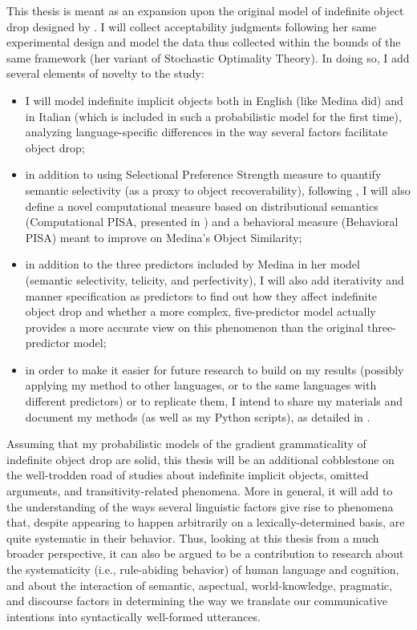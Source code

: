 This thesis is meant as an expansion upon the original model of indefinite object drop designed by \textcite{Medina2007}. I will collect acceptability judgments following her same experimental design and model the data thus collected within the bounds of the same framework (her variant of Stochastic Optimality Theory). In doing so, I add several elements of novelty to the study:
\begin{itemize}
    \item I will model indefinite implicit objects both in English (like Medina did) and in Italian (which is included in such a probabilistic model for the first time), analyzing language-specific differences in the way several factors facilitate object drop;
    \item in addition to using  Selectional Preference Strength measure to quantify semantic selectivity (as a proxy to object recoverability), following \textcite{Medina2007}, I will also define a novel computational measure based on distributional semantics (Computational PISA, presented in \textcite{CappelliLenciPISA}) and a behavioral measure (Behavioral PISA) meant to improve on Medina's Object Similarity;
    \item in addition to the three predictors included by Medina in her model (semantic selectivity, telicity, and perfectivity), I will also add iterativity and manner specification as predictors to find out how they affect indefinite object drop and whether a more complex, five-predictor model actually provides a more accurate view on this phenomenon than the original three-predictor model;
    \item in order to make it easier for future research to build on my results (possibly applying my method to other languages, or to the same languages with different predictors) or to replicate them, I intend to share my materials and document my methods (as well as my Python scripts), as detailed in .
\end{itemize}

Assuming that my probabilistic models of the gradient grammaticality of indefinite object drop are solid, this thesis will be an additional cobblestone on the well-trodden road of studies about indefinite implicit objects, omitted arguments, and transitivity-related phenomena. More in general, it will add to the understanding of the ways several linguistic factors give rise to phenomena that, despite appearing to happen arbitrarily on a lexically-determined basis, are quite systematic in their behavior. Thus, looking at this thesis from a much broader perspective, it can also be argued to be a contribution to research about the systematicity (i.e., rule-abiding behavior) of human language and cognition, and about the interaction of semantic, aspectual, world-knowledge, pragmatic, and discourse factors in determining the way we translate our communicative intentions into syntactically well-formed utterances.

